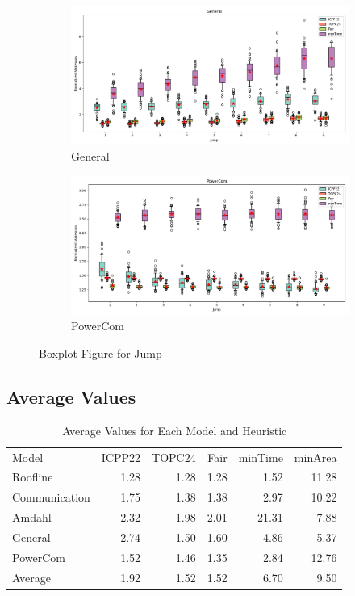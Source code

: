 \documentclass{article}
\begin{document}
\begin{figure}[htbp]
\\[2ex]
\begin{subfigure}[b]{0.32\textwidth}\includegraphics[width=\textwidth]{Results/Jump/Jump_General_boxplot}\caption{General}\label{fig:boxplot_figures_Jump_General}\end{subfigure}
\hfill
\begin{subfigure}[b]{0.32\textwidth}\includegraphics[width=\textwidth]{Results/Jump/Jump_PowerCom_boxplot}\caption{PowerCom}\label{fig:boxplot_figures_Jump_PowerCom}\end{subfigure}
\hfill
\caption{Boxplot Figure for Jump}
\label{fig:boxplot_figures_Jump}
\end{figure}


\FloatBarrier 

\subsection{Average Values}
\begin{table}[htbp]
\centering
\caption{Average Values for Each Model and Heuristic}
\label{tab:average_values}
\begin{tabular}{lrrrrr}
\toprule
Model & ICPP22 & TOPC24 & Fair & minTime & minArea \\
Roofline & 1.28 & 1.28 & 1.28 & 1.52 & 11.28 \\
Communication & 1.75 & 1.38 & 1.38 & 2.97 & 10.22 \\
Amdahl & 2.32 & 1.98 & 2.01 & 21.31 & 7.88 \\
General & 2.74 & 1.50 & 1.60 & 4.86 & 5.37 \\
PowerCom & 1.52 & 1.46 & 1.35 & 2.84 & 12.76 \\
\midrule
Average & 1.92 & 1.52 & 1.52 & 6.70 & 9.50 \\
\bottomrule
\end{tabular}
\end{table}
\end{document}
